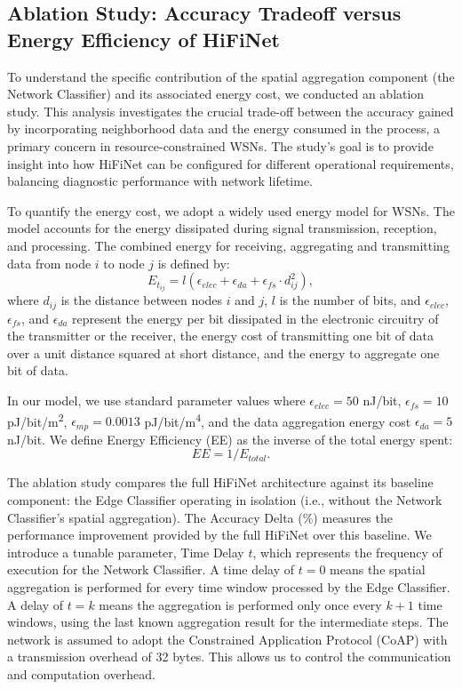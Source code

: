 \subsection{Ablation Study: Accuracy Tradeoff versus Energy Efficiency of HiFiNet}
To understand the specific contribution of the spatial aggregation component (the Network Classifier) and its associated energy cost, we conducted an ablation study. This analysis investigates the crucial trade-off between the accuracy gained by incorporating neighborhood data and the energy consumed in the process, a primary concern in resource-constrained WSNs. The study's goal is to provide insight into how HiFiNet can be configured for different operational requirements, balancing diagnostic performance with network lifetime.

To quantify the energy cost, we adopt a widely used energy model for WSNs. The model accounts for the energy dissipated during signal transmission, reception, and processing. The combined energy for receiving, aggregating and transmitting data from node \(i\) to node \(j\) is defined by:
\begin{equation}
  E_{t_{ij}} = l (\epsilon_{elec} + \epsilon_{da} + \epsilon_{fs} \cdot d^2_{ij}),
\end{equation}
where \(d_{ij}\) is the distance between nodes \(i\) and \(j\), \(l\) is the number of bits, and \(\epsilon_{elec}\), \(\epsilon_{fs}\), and \(\epsilon_{da}\) represent the energy per bit dissipated in the electronic circuitry of the transmitter or the receiver, the energy cost of transmitting one bit of data over a unit distance squared at short distance, and the energy to aggregate one bit of data.

In our model, we use standard parameter values where \(\epsilon_{elec} = 50\) \si{nJ/bit}, \(\epsilon_{fs} = 10\) \si{pJ/bit/m^2}, \(\epsilon_{mp} = 0.0013\) \si{pJ/bit/m^4}, and the data aggregation energy cost \(\epsilon_{da} = 5 \) \si{nJ/bit}. We define Energy Efficiency (EE) as the inverse of the total energy spent:
\begin{equation}
  EE = 1 / E_{total}.
\end{equation}

The ablation study compares the full HiFiNet architecture against its baseline component: the Edge Classifier operating in isolation (i.e., without the Network Classifier's spatial aggregation). The Accuracy Delta (\%) measures the performance improvement provided by the full HiFiNet over this baseline. We introduce a tunable parameter, Time Delay \(t\), which represents the frequency of execution for the Network Classifier. A time delay of \(t=0\) means the spatial aggregation is performed for every time window processed by the Edge Classifier. A delay of $t=k$ means the aggregation is performed only once every \(k+1\) time windows, using the last known aggregation result for the intermediate steps. The network is assumed to adopt the Constrained Application Protocol (CoAP) with a transmission overhead of 32 bytes. This allows us to control the communication and computation overhead.

